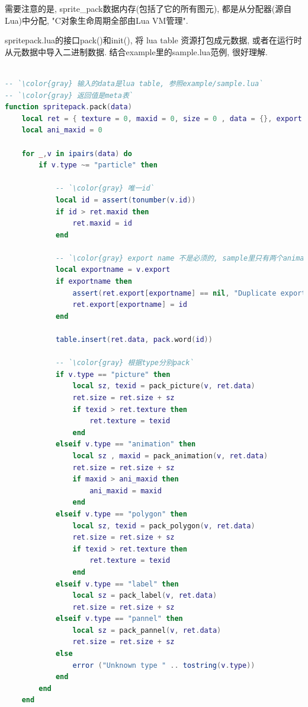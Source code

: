 {需要注意的是, sprite\_pack数据内存(包括了它的所有图元), 都是从分配器(源自Lua)中分配, "C对象生命周期全部由Lua VM管理". }\par

{spritepack.lua的接口pack()和init(), 将 lua table 资源打包成元数据, 或者在运行时从元数据中导入二进制数据. 结合example里的sample.lua范例, 很好理解.}\par

\begin{lstlisting}[language=lua]

-- `\color{gray} 输入的data是lua table, 参照example/sample.lua`
-- `\color{gray} 返回值是meta表`
function spritepack.pack(data)
    local ret = { texture = 0, maxid = 0, size = 0 , data = {}, export = {} }
    local ani_maxid = 0

    for _,v in ipairs(data) do
        if v.type ~= "particle" then

            -- `\color{gray} 唯一id`
            local id = assert(tonumber(v.id))
            if id > ret.maxid then
                ret.maxid = id
            end

            -- `\color{gray} export name 不是必须的, sample里只有两个animation有`
            local exportname = v.export
            if exportname then
                assert(ret.export[exportname] == nil, "Duplicate export name"..exportname)
                ret.export[exportname] = id
            end

            table.insert(ret.data, pack.word(id))

            -- `\color{gray} 根据type分别pack`
            if v.type == "picture" then
                local sz, texid = pack_picture(v, ret.data)
                ret.size = ret.size + sz
                if texid > ret.texture then
                    ret.texture = texid
                end
            elseif v.type == "animation" then
                local sz , maxid = pack_animation(v, ret.data)
                ret.size = ret.size + sz
                if maxid > ani_maxid then
                    ani_maxid = maxid
                end
            elseif v.type == "polygon" then
                local sz, texid = pack_polygon(v, ret.data)
                ret.size = ret.size + sz
                if texid > ret.texture then
                    ret.texture = texid
                end
            elseif v.type == "label" then
                local sz = pack_label(v, ret.data)
                ret.size = ret.size + sz
            elseif v.type == "pannel" then
                local sz = pack_pannel(v, ret.data)
                ret.size = ret.size + sz
            else
                error ("Unknown type " .. tostring(v.type))
            end
        end
    end


\end{lstlisting}
